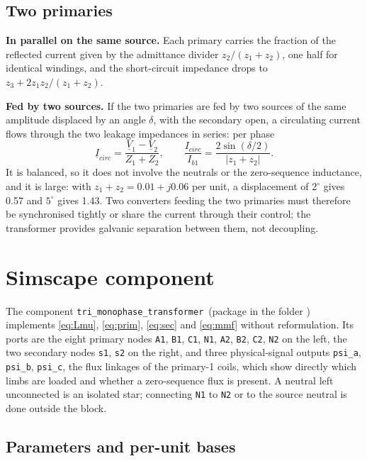 \documentclass[10pt,a4paper]{scrartcl}
\newcommand{\ph}[1]{\underline{#1}}
\newcommand{\sscname}{\texttt{tri\_monophase\_transformer}}
\begin{document}
\begin{onehalfspace}
\subsection{Two primaries}

\textbf{In parallel on the same source.} Each primary carries the fraction of the reflected current given by the admittance divider $z_2/(z_1+z_2)$, one half for identical windings, and the short-circuit impedance drops to $z_3 + 2 z_1 z_2/(z_1+z_2)$.

\textbf{Fed by two sources.} If the two primaries are fed by two sources of the same amplitude displaced by an angle $\delta$, with the secondary open, a circulating current flows through the two leakage impedances in series: per phase
\begin{equation}
\ph{I}_{circ} = \frac{\ph{V}_1 - \ph{V}_2}{Z_1 + Z_2} , \qquad
\frac{I_{circ}}{I_{b1}} = \frac{2\sin(\delta/2)}{|z_1+z_2|} .
\label{eq:circ}
\end{equation}
It is balanced, so it does not involve the neutrals or the zero-sequence inductance, and it is large: with $z_1 + z_2 = 0.01 + j0.06$ per unit, a displacement of $2^\circ$ gives \SI{0.57}{\pu} and $5^\circ$ gives \SI{1.43}{\pu}. Two converters feeding the two primaries must therefore be synchronised tightly or share the current through their control; the transformer provides galvanic separation between them, not decoupling.

\section{Simscape component}
\label{sec:ssc}

The component \sscname\ (package  in the folder ) implements \eqref{eq:Lmu}, \eqref{eq:prim}, \eqref{eq:sec} and \eqref{eq:mmf} without reformulation. Its ports are the eight primary nodes \texttt{A1}, \texttt{B1}, \texttt{C1}, \texttt{N1}, \texttt{A2}, \texttt{B2}, \texttt{C2}, \texttt{N2} on the left, the two secondary nodes \texttt{s1}, \texttt{s2} on the right, and three physical-signal outputs \texttt{psi\_a}, \texttt{psi\_b}, \texttt{psi\_c}, the flux linkages of the primary-1 coils, which show directly which limbs are loaded and whether a zero-sequence flux is present. A neutral left unconnected is an isolated star; connecting \texttt{N1} to \texttt{N2} or to the source neutral is done outside the block.

\subsection{Parameters and per-unit bases}
\label{sec:pu}


\end{onehalfspace}
\end{document}

